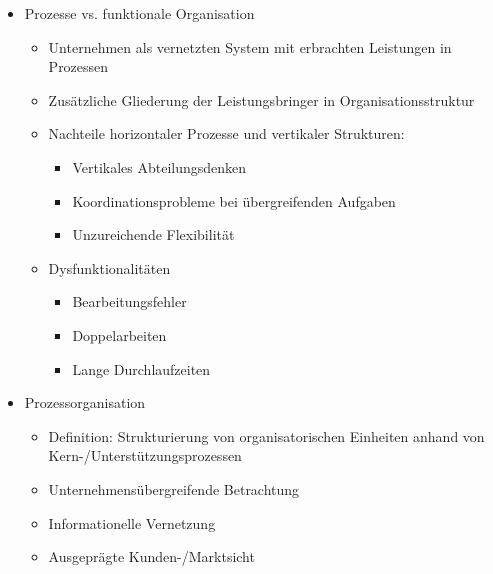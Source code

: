 \begin{itemize}

\item Prozesse vs. funktionale Organisation
	\begin{itemize}
	\item Unternehmen als vernetzten System mit erbrachten Leistungen in Prozessen
	\item Zusätzliche Gliederung der Leistungsbringer in Organisationsstruktur
	\item Nachteile horizontaler Prozesse und vertikaler Strukturen:
		\begin{itemize}
		\item Vertikales Abteilungsdenken 
		\item Koordinationsprobleme bei übergreifenden Aufgaben
		\item Unzureichende Flexibilität
		\end{itemize}			
	\item Dysfunktionalitäten 
		\begin{itemize}
		\item Bearbeitungsfehler
		\item Doppelarbeiten
		\item Lange Durchlaufzeiten
		\end{itemize}			
		
	\end{itemize}
	
\item Prozessorganisation
	\begin{itemize}
	\item Definition: Strukturierung von organisatorischen Einheiten anhand von Kern-/Unterstützungsprozessen
	\item Unternehmensübergreifende Betrachtung
	\item Informationelle Vernetzung
	\item Ausgeprägte Kunden-/Marktsicht
	\end{itemize}
	

\end{itemize}
